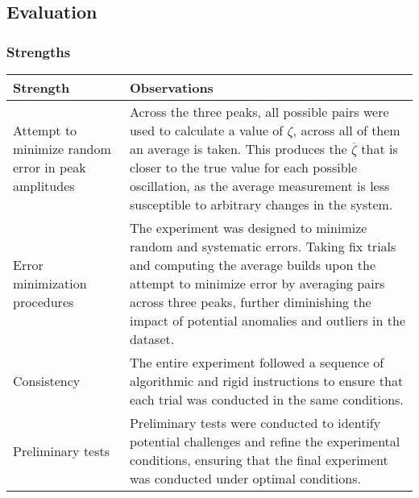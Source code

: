 \documentclass[a4paper,12pt]{article}
\newcommand{\thcolor}{\cellcolor{Blue!25}}
\begin{document}
\subsection{Evaluation}

\subsubsection{Strengths}

\begin{center}
  \begin{tabular}{|p{}|p{}|}
    \hline
    \thcolor Strength                                   & \thcolor Observations                                                                                                                                                                                                                                                                                                 \\ \hline
    Attempt to minimize random error in peak amplitudes & Across the three peaks, all possible pairs were used to calculate a value of $\zeta$, across all of them an average is taken. This produces the $\overline{\zeta}$ that is closer to the true value for each possible oscillation, as the average measurement is less susceptible to arbitrary changes in the system. \\ \hline
    Error minimization procedures                       & The experiment was designed to minimize random and systematic errors. Taking fix trials and computing the average builds upon the attempt to minimize error by averaging pairs across three peaks, further diminishing the impact of potential anomalies and outliers in the dataset.                                 \\ \hline
    Consistency                                         & The entire experiment followed a sequence of algorithmic and rigid instructions to ensure that each trial was conducted in the same conditions.                                                                                                                                                                       \\ \hline
    Preliminary tests                                   & Preliminary tests were conducted to identify potential challenges and refine the experimental conditions, ensuring that the final experiment was conducted under optimal conditions.                                                                                                                                  \\ \hline
  \end{tabular}
\end{center}
\end{document}
